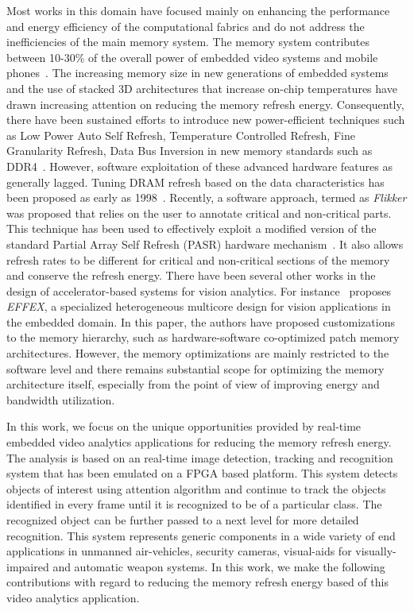 Most works in this domain have focused mainly on enhancing the performance and energy efficiency of the computational fabrics and do not address the inefficiencies of the main memory system. The memory system contributes between 10-30\% of the overall power of embedded video systems and mobile phones~\cite{CarrollAaronHeiser2010}. 
The increasing memory size in new generations of embedded systems and the use of stacked 3D architectures that increase on-chip temperatures have drawn increasing attention on reducing the memory refresh energy. Consequently, there have been sustained efforts to introduce new power-efficient techniques such as Low Power Auto Self Refresh, Temperature Controlled Refresh, Fine Granularity Refresh, Data Bus Inversion in new memory standards such as DDR4~\cite{jedec-sdram-standards}.  However, software exploitation of these advanced hardware features as generally lagged. 
Tuning DRAM refresh based on the data characteristics has been proposed as early as 1998~\cite{islped98}. Recently, a software approach, termed as \emph{Flikker} was proposed that relies on the user to annotate critical and non-critical parts. This technique has been used to effectively exploit a modified version of the standard Partial Array Self Refresh (PASR) hardware mechanism~\cite{Liu2011}. It also allows refresh rates to be different for critical and non-critical sections of the memory and conserve the refresh energy. 
There have been several other works in the design of accelerator-based systems for vision analytics. For instance~\cite{Effex} proposes \emph{EFFEX}, a specialized heterogeneous multicore design for vision applications in the embedded domain. In this paper, the authors have proposed customizations to the memory hierarchy, such as hardware-software co-optimized patch memory architectures. However, the memory optimizations are mainly restricted to the software level and there remains substantial scope for optimizing the memory architecture itself, especially from the point of view of improving energy and bandwidth utilization.

In this work, we focus on the unique opportunities provided by real-time embedded video analytics applications for reducing the memory refresh energy. The analysis is based on an real-time image detection, tracking and recognition system that has been emulated on a FPGA based platform. This system detects objects of interest using attention algorithm and continue to track the objects identified in every frame until it is recognized to be of a particular class. The recognized object can be further passed to a next level for more detailed recognition. This system represents generic components in a wide variety of end applications in unmanned air-vehicles, security cameras, visual-aids for visually-impaired and automatic weapon systems. In this work, we make the following contributions with regard to reducing the memory refresh energy based of this video analytics application.

